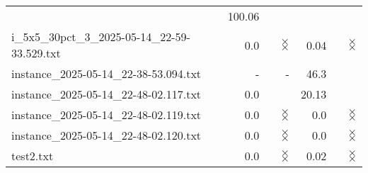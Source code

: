\documentclass{article}
\begin{document}
\begin{center}
\begin{tabular}{lrrrr}
 & 100.06 & 
\\
i\_5x5\_30pct\_3\_2025-05-14\_22-59-33.529.txt & 0.0 & 
$\times$
$\times$
 & 0.04 & 
$\times$
$\times$
\\
instance\_2025-05-14\_22-38-53.094.txt & - & - 
 & 46.3 & 
\\
instance\_2025-05-14\_22-48-02.117.txt & 0.0 & 
 & 20.13 & 
\\
instance\_2025-05-14\_22-48-02.119.txt & 0.0 & 
$\times$
$\times$
 & 0.0 & 
$\times$
$\times$
\\
instance\_2025-05-14\_22-48-02.120.txt & 0.0 & 
$\times$
$\times$
 & 0.0 & 
$\times$
$\times$
\\
test2.txt & 0.0 & 
$\times$
$\times$
 & 0.02 & 
$\times$
$\times$
\\
\hline\end{tabular}
\end{center}
\end{document}
